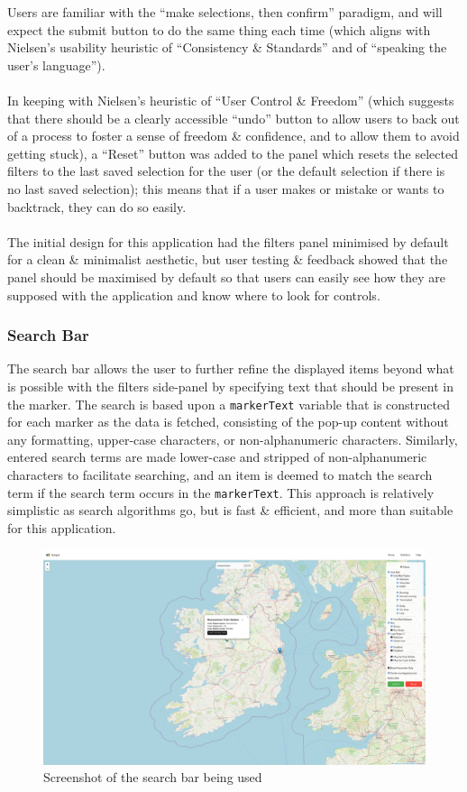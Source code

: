 \documentclass[a4paper,11pt]{report}
\begin{document}
Users are familiar with the ``make selections, then confirm'' paradigm, and will expect the submit button to do the same thing each time (which aligns with Nielsen's usability heuristic of ``Consistency \& Standards'' and of ``speaking the user's language''\supercite{nielsenheuristics}).
\\\\
In keeping with Nielsen's heuristic of ``User Control \& Freedom'' (which suggests that there should be a clearly accessible ``undo'' button to allow users to back out of a process to foster a sense of freedom \& confidence, and to allow them to avoid getting stuck), a ``Reset'' button was added to the panel which resets the selected filters to the last saved selection for the user (or the default selection if there is no last saved selection);
this means that if a user makes or mistake or wants to backtrack, they can do so easily.
\\\\
The initial design for this application had the filters panel minimised by default for a clean \& minimalist aesthetic, but user testing \& feedback showed that the panel should be maximised by default so that users can easily see how they are supposed with the application and know where to look for controls.

\subsubsection{Search Bar}
The search bar allows the user to further refine the displayed items beyond what is possible with the filters side-panel by specifying text that should be present in the marker.
The search is based upon a \verb|markerText| variable that is constructed for each marker as the data is fetched, consisting of the pop-up content without any formatting, upper-case characters, or non-alphanumeric characters.
Similarly, entered search terms are made lower-case and stripped of non-alphanumeric characters to facilitate searching, and an item is deemed to match the search term if the search term occurs in the \verb|markerText|.
This approach is relatively simplistic as search algorithms go, but is fast \& efficient, and more than suitable for this application.

\begin{figure}[H]
    \centering
    \includegraphics[width=\textwidth]{./images/searchstephens.png}
    \caption{Screenshot of the search bar being used}
\end{figure}
\end{document}
